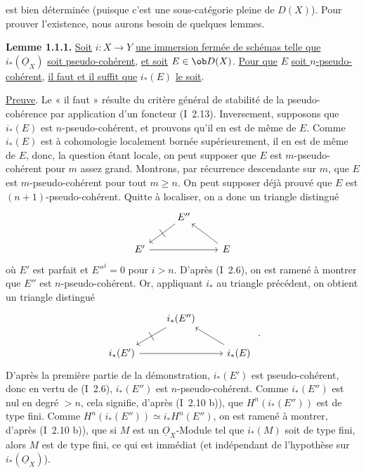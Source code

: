 est
bien déterminée (puisque c'est une sous-catégorie pleine de \(D(X)\)). Pour prouver l'existence, nous aurons besoin de quelques lemmes.

\textbf{Lemme 1.1.1.} \uline{Soit} \(i:X\to Y\) \uline{une immersion fermée de schémas telle que} \(i_*(\underline{O}_X)\) \uline{soit pseudo-cohérent}, \uline{et soit} \(E\in\ob D(X)\). \uline{Pour que} \(E\) \uline{soit \(n\)-pseudo-cohérent}, \uline{il faut et il suffit que} \(i_*(E)\) \uline{le soit}.

\uline{Preuve}. Le « il faut » résulte du critère général de stabilité de la pseudo-cohérence par application d'un foncteur (I~2.13). Inversement, supposons que \(i_*(E)\) est \(n\)-pseudo-cohérent, et prouvons qu'il en est de même de \(E\). Comme \(i_*(E)\) est à cohomologie localement bornée supérieurement, il en est de même de \(E\), donc, la question étant locale, on peut supposer que \(E\) est \(m\)-pseudo-cohérent pour \(m\) assez grand. Montrons, par récurrence descendante sur \(m\), que \(E\) est \(m\)-pseudo-cohérent pour tout \(m\geq n\). On peut supposer déjà prouvé que \(E\) est \((n+1)\)-pseudo-cohérent. Quitte à localiser, on a donc un triangle distingué
\[
\begin{tikzcd}
& E'' \arrow[dl,"|" marking] & \\
E' \arrow[rr] & & E \arrow[ul]
\end{tikzcd}
\]
où \(E'\) est parfait et \(E''^i=0\) pour \(i>n\). D'après (I~2.6), on est ramené à montrer que \(E''\) est \(n\)-pseudo-cohérent. Or, appliquant \(i_*\) au triangle précédent, on obtient un triangle distingué
\[
\begin{tikzcd}
& i_*(E'') \arrow[dl,"|" marking] & \\
i_*(E') \arrow[rr] & & i_*(E) \arrow[ul]
\end{tikzcd}\ .
\]
D'après la première partie de la démonstration, \(i_*(E')\) est pseudo-cohérent, donc en vertu de (I~2.6), \(i_*(E'')\) est \(n\)-pseudo-cohérent. Comme \(i_*(E'')\) est nul en degré \(>n\), cela signifie, d'après (I~2.10 b)), que \(H^n(i_*(E''))\) est de type fini. Comme \(H^n(i_*(E''))\simeq i_*H^n(E'')\), on est ramené à montrer, d'après (I~2.10 b)), que si \(M\) est un \(\underline{O}_X\)-Module tel que \(i_*(M)\) soit de type fini, alors \(M\) est de type fini, ce qui est immédiat (et indépendant de l'hypothèse sur \(i_*(\underline{O}_X)\)).

